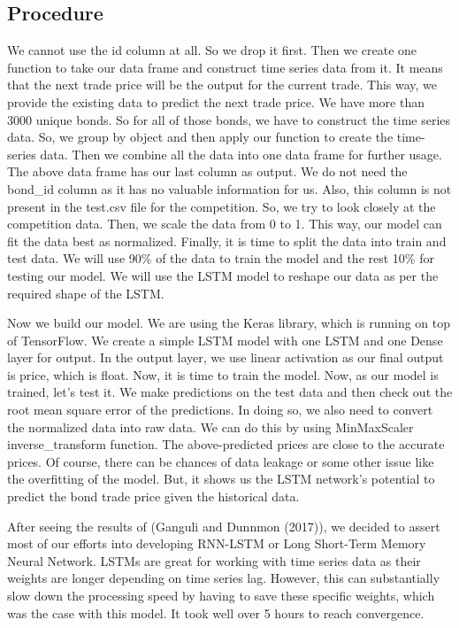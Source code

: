 \documentclass[
  man]{apa6}
\begin{document}
\hypertarget{procedure}{%
\subsection{Procedure}\label{procedure}}

We cannot use the id column at all. So we drop it first. Then we create one function to take our data frame and construct time series data from it. It means that the next trade price will be the output for the current trade. This way, we provide the existing data to predict the next trade price. We have more than 3000 unique bonds. So for all of those bonds, we have to construct the time series data. So, we group by object and then apply our function to create the time-series data. Then we combine all the data into one data frame for further usage. The above data frame has our last column as output. We do not need the bond\_id column as it has no valuable information for us. Also, this column is not present in the test.csv file for the competition. So, we try to look closely at the competition data. Then, we scale the data from 0 to 1. This way, our model can fit the data best as normalized. Finally, it is time to split the data into train and test data. We will use 90\% of the data to train the model and the rest 10\% for testing our model. We will use the LSTM model to reshape our data as per the required shape of the LSTM.

\par

Now we build our model. We are using the Keras library, which is running on top of TensorFlow. We create a simple LSTM model with one LSTM and one Dense layer for output. In the output layer, we use linear activation as our final output is price, which is float. Now, it is time to train the model. Now, as our model is trained, let's test it. We make predictions on the test data and then check out the root mean square error of the predictions. In doing so, we also need to convert the normalized data into raw data. We can do this by using MinMaxScaler inverse\_transform function. The above-predicted prices are close to the accurate prices. Of course, there can be chances of data leakage or some other issue like the overfitting of the model. But, it shows us the LSTM network's potential to predict the bond trade price given the historical data.

\par

After seeing the results of (Ganguli and Dunnmon (2017)), we decided to assert most of our efforts into developing RNN-LSTM or Long Short-Term Memory Neural Network. LSTMs are great for working with time series data as their weights are longer depending on time series lag. However, this can substantially slow down the processing speed by having to save these specific weights, which was the case with this model. It took well over 5 hours to reach convergence.
\end{document}
